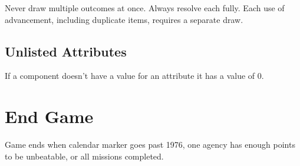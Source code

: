 \documentclass[12pt]{article}
\begin{document}
\begin{multicols*}{2}
Never draw multiple outcomes at once. Always resolve each fully. Each use of advancement, including duplicate items, requires a separate draw.

\subsection*{Unlisted Attributes}
If a component doesn't have a value for an attribute it has a value of 0.

\section*{End Game}
Game ends when calendar marker goes past 1976, one agency has enough points to be unbeatable, or all missions completed.

\end{multicols*}
\end{document}
